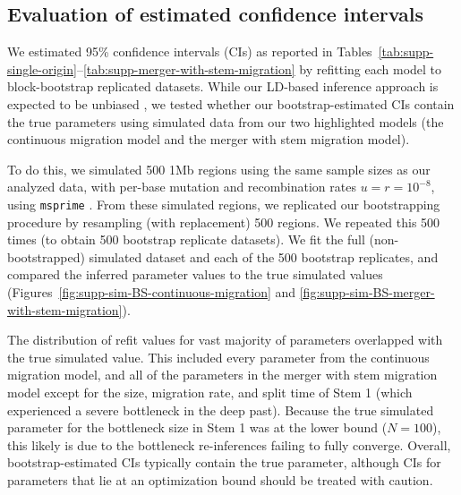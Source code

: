 \documentclass[]{article}
\begin{document}
\subsection{Evaluation of estimated confidence intervals}
\label{sec:confidence-intervals}

We estimated 95\% confidence intervals (CIs) as reported in
Tables~\ref{tab:supp-single-origin}--\ref{tab:supp-merger-with-stem-migration}
by refitting each model to block-bootstrap replicated datasets. While our
LD-based inference approach is expected to be unbiased
\citep{Ragsdale2019-nt,Ragsdale2020-nz}, we tested whether our
bootstrap-estimated CIs contain the true parameters using simulated data from
our two highlighted models (the continuous migration model and the merger with
stem migration model).

To do this, we simulated 500 1Mb regions using the same sample sizes as our
analyzed data, with per-base mutation and recombination rates $u=r=10^{-8}$,
using \texttt{msprime} \citep{Baumdicker2022-mj}. From these simulated regions,
we replicated our bootstrapping procedure by resampling (with replacement) 500
regions. We repeated this 500 times (to obtain 500 bootstrap replicate
datasets). We fit the full (non-bootstrapped) simulated dataset and each of the
500 bootstrap replicates, and compared the inferred parameter values to the
true simulated values (Figures~\ref{fig:supp-sim-BS-continuous-migration} and
\ref{fig:supp-sim-BS-merger-with-stem-migration}).

The distribution of refit values for vast majority of parameters overlapped
with the true simulated value. This included every parameter from the
continuous migration model, and all of the parameters in the merger with stem
migration model except for the size, migration rate, and split time of Stem 1
(which experienced a severe bottleneck in the deep past). Because the true
simulated parameter for the bottleneck size in Stem 1 was at the lower bound
($N=100$), this likely is due to the bottleneck re-inferences failing to
fully converge. Overall, bootstrap-estimated CIs typically contain the true
parameter, although CIs for parameters that lie at an optimization bound
should be treated with caution.
\end{document}
